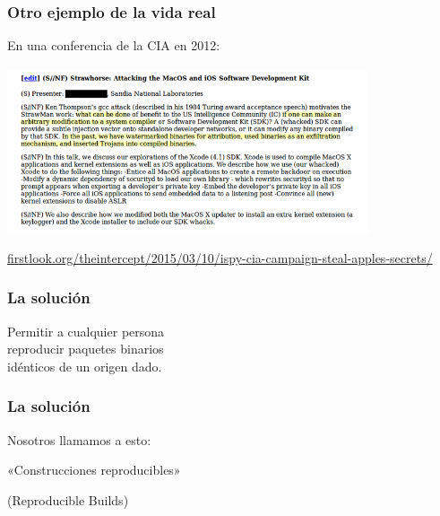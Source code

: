 \documentclass[14pt,aspectratio=169]{beamer}
\begin{document}
\begin{frame}[fragile]
\frametitle{Otro ejemplo de la vida real}

En una conferencia de la CIA en 2012:

\begin{center}
\includegraphics[width=0.8\textwidth]{images/strawhorse.png}

{\footnotesize 
\url{firstlook.org/theintercept/2015/03/10/ispy-cia-campaign-steal-apples-secrets/}
}
\end{center}

\end{frame}

\begin{frame}
\frametitle{La solución}

\begin{center}
\Large
Permitir a cualquier persona\\
reproducir paquetes binarios\\
idénticos de un origen dado.
\end{center}

\end{frame}

\begin{frame}
\frametitle{La solución}

\begin{center}
Nosotros llamamos a esto:

\huge
«Construcciones reproducibles» \\
\begin{LARGE}
(Reproducible Builds)
\end{LARGE}
\end{center}

\end{frame}
\end{document}
